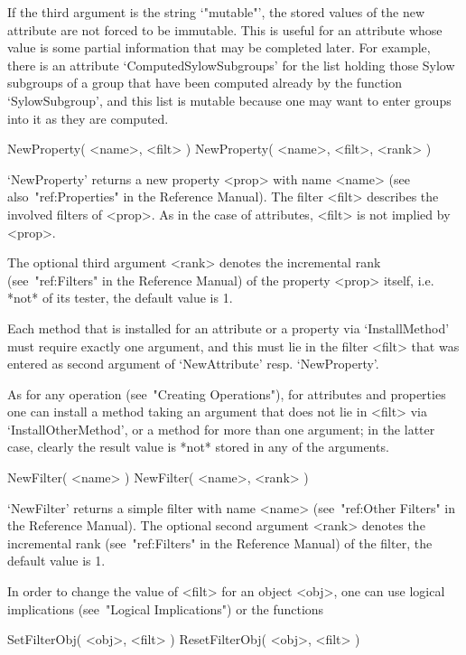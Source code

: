 If the third argument is the string `"mutable"', the stored values of the
new attribute are not forced to be immutable.
This is useful for an attribute whose value is some partial information
that may be completed later.
For example, there is an attribute `ComputedSylowSubgroups' for the list
holding those Sylow subgroups of a group that have been computed already
by the function `SylowSubgroup',
and this list is mutable because one may want to enter groups into it
as they are computed.

\>NewProperty( <name>, <filt> )
\)\fmark NewProperty( <name>, <filt>, <rank> )

`NewProperty' returns a new property <prop> with name <name>
(see also~"ref:Properties" in the Reference Manual).
The filter <filt> describes the involved filters of <prop>.
As in the case of attributes, <filt> is not implied by <prop>.

The optional third argument <rank> denotes the incremental rank
(see~"ref:Filters" in the Reference Manual) of the property <prop> itself,
i.e. *not* of its tester, the default value is 1.

Each method that is installed for an attribute or a property
via `InstallMethod' must require exactly one argument,
and this must lie in the filter <filt> that was entered as second
argument of `NewAttribute' resp. `NewProperty'.

As for any operation (see~"Creating Operations"),
for attributes and properties one can install a method taking an argument
that does not lie in <filt> via `InstallOtherMethod',
or a method for more than one argument;
in the latter case,
clearly the result value is *not* stored in any of the arguments.



\>NewFilter( <name> )
\)\fmark NewFilter( <name>, <rank> )

`NewFilter' returns a simple filter with name <name>
(see~"ref:Other Filters" in the Reference Manual).
The optional second argument <rank> denotes the incremental rank
(see~"ref:Filters" in the Reference Manual) of the filter,
the default value is 1.

In order to change the value of <filt> for an object <obj>,
one can use logical implications (see~"Logical Implications") or
the functions

\>SetFilterObj( <obj>, <filt> )
\>ResetFilterObj( <obj>, <filt> )

